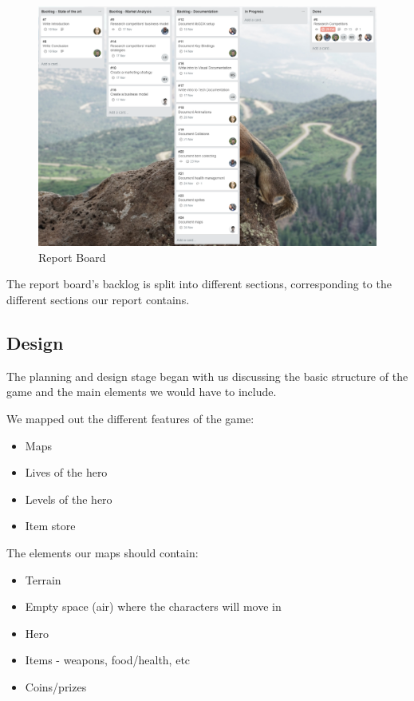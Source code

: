 \documentclass[12p]{article}
\begin{document}
\begin{figure}[ht]
  \center
  \includegraphics[width=1\textwidth]{Methodology/ReportBoard.png}
  \caption{Report Board}
\end{figure}

The report board’s backlog is split into different sections, corresponding to the different sections our report contains.

\subsection{Design}
The planning and design stage began with us discussing the basic structure of the game and the main elements we would have to include.

We mapped out the different features of the game:
\begin{itemize}
  \item Maps
  \item Lives of the hero
  \item Levels of the hero
  \item Item store
\end{itemize}

The elements our maps should contain:
\begin{itemize}
  \item Terrain
  \item Empty space (air) where the characters will move in
  \item Hero
  \item Items - weapons, food/health, etc
  \item Coins/prizes
\end{itemize}
\end{document}
